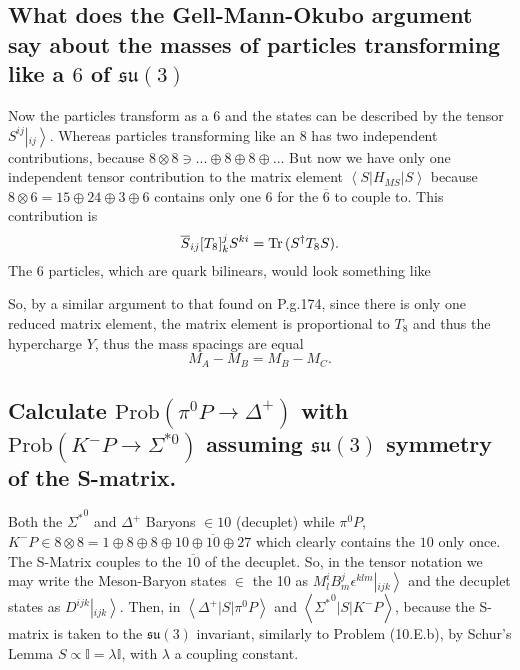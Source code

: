 \documentclass[main.tex]{subfiles}
\begin{document}
\subsection{What does the Gell-Mann-Okubo argument say about the masses of particles transforming like a $6$ of $\mathfrak{su}(3)$}
Now the particles transform as a $6$ and the states can be described by the tensor $S^{ij}\left|_{ij}\right>$. Whereas particles transforming like an $8$ has two independent contributions, because $8\otimes8\ni...\oplus8\oplus8\oplus..$. But now we have only one independent tensor contribution to the matrix element $\left<S|H_{MS}|S\right>$ because $8\otimes6=15\oplus24\oplus3\oplus6$ contains only one $6$ for the $\overline{6}$ to couple to. This contribution is
\begin{equation}
\overline{S}_{ij}[T_8]^j_kS^{ki}=\operatorname{Tr}{(S^{\dagger}T_8S)}.
\end{equation}
The $6$ particles, which are quark bilinears, would look something like
\begin{figure}[H]
\centering
{}
\end{figure}
So, by a similar argument to that found on P.g.174, since there is only one reduced matrix element, the matrix element is proportional to $T_8$ and thus the hypercharge $Y$, thus the mass spacings are equal
\begin{equation}
M_A-M_B=M_B-M_C.
\end{equation}

\subsection{Calculate $\text{Prob}(\pi^0P\rightarrow\Delta^+)$ with $\text{Prob}(K^-P\rightarrow\Sigma^{*0})$ assuming $\mathfrak{su}(3)$ symmetry of the S-matrix.}
Both the ${\Sigma^*}^{0}$ and $\Delta^+$ Baryons $\in10$ (decuplet) while $\pi^0P$, $K^-P\in8\otimes8=1\oplus8\oplus8\oplus10\oplus\overline{10}\oplus27$ which clearly contains the $10$ only once. The S-Matrix couples to the $\overline{10}$ of the decuplet.
So, in the tensor notation we may write the Meson-Baryon states $\in$ the 10 as $M^i_lB^j_m\epsilon^{klm}\left|_{ijk}\right>$ and the decuplet states as $D^{ijk}\left|_{ijk}\right>$. Then, in $\left<\Delta^+|S|\pi^0P\right>$ and $\left<{\Sigma^*}^{0}|S|K^-P\right>$, because the S-matrix is taken to the $\mathfrak{su}(3)$ invariant, similarly to Problem (10.E.b), by Schur's Lemma $S\propto\mathbb{I}=\lambda\mathbb{I}$, with $\lambda$ a coupling constant.
\end{document}
